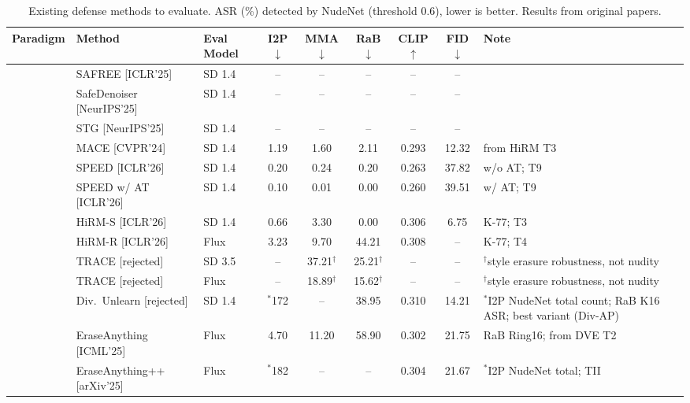 \documentclass[11pt,a4paper]{article}
\begin{document}
\begin{table}[H]
\centering
\caption{Existing defense methods to evaluate. ASR (\%) detected by NudeNet (threshold 0.6), lower is better. Results from original papers.}
\small
\renewcommand{\arraystretch}{1.3}
\begin{tabularx}{\textwidth}{@{} p{1.5cm} p{2cm} l c c c c c X @{}}
\toprule
\textbf{Paradigm} & \textbf{Method} & \textbf{Eval Model} & \textbf{I2P$\downarrow$} & \textbf{MMA$\downarrow$} & \textbf{RaB$\downarrow$} & \textbf{CLIP$\uparrow$} & \textbf{FID$\downarrow$} & \textbf{Note} \\
\midrule
{}
 & SAFREE \scriptsize{[ICLR'25]} & SD 1.4 & -- & -- & -- & -- & -- & \\
 & SafeDenoiser \scriptsize{[NeurIPS'25]} & SD 1.4 & -- & -- & -- & -- & -- & \\
 & STG \scriptsize{[NeurIPS'25]} & SD 1.4 & -- & -- & -- & -- & -- & \\
\midrule
{}
 & MACE \scriptsize{[CVPR'24]} & SD 1.4 & 1.19 & 1.60 & 2.11 & 0.293 & 12.32 & from HiRM T3 \\
 & SPEED \scriptsize{[ICLR'26]} & SD 1.4 & 0.20 & 0.24 & 0.20 & 0.263 & 37.82 & w/o AT; T9 \\
 & SPEED w/ AT \scriptsize{[ICLR'26]} & SD 1.4 & 0.10 & 0.01 & 0.00 & 0.260 & 39.51 & w/ AT; T9 \\
 & HiRM-S \scriptsize{[ICLR'26]} & SD 1.4 & 0.66 & 3.30 & 0.00 & 0.306 & 6.75 & K-77; T3 \\
 & HiRM-R \scriptsize{[ICLR'26]} & Flux & 3.23 & 9.70 & 44.21 & 0.308 & -- & K-77; T4 \\
 & TRACE \scriptsize{[rejected]} & SD 3.5 & -- & 37.21$^\dagger$ & 25.21$^\dagger$ & -- & -- & $^\dagger$style erasure robustness, not nudity \\
 & TRACE \scriptsize{[rejected]} & Flux & -- & 18.89$^\dagger$ & 15.62$^\dagger$ & -- & -- & $^\dagger$style erasure robustness, not nudity \\
 & Div.\ Unlearn \scriptsize{[rejected]} & SD 1.4 & $^*$172 & -- & 38.95 & 0.310 & 14.21 & $^*$I2P NudeNet total count; RaB K16 ASR; best variant (Div-AP) \\
 & EraseAnything \scriptsize{[ICML'25]} & Flux & 4.70 & 11.20 & 58.90 & 0.302 & 21.75 & RaB Ring16; from DVE T2 \\
 & EraseAnything++ \scriptsize{[arXiv'25]} & Flux & $^*$182 & -- & -- & 0.304 & 21.67 & $^*$I2P NudeNet total; TII \\

\end{tabularx}
\end{table}
\end{document}
